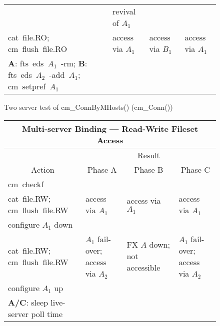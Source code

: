 \begin{figure}
\begin{tabular}{|p{1.4in}|p{0.9in}|p{0.9in}|p{0.9in}|}
 &
{\raggedright revival of $A_{1}$} \\
%
\hline
{\raggedright cat~file.RO;\\cm~flush~file.RO} &
{\raggedright access via $A_{1}$} &
{\raggedright access via $B_{1}$} &
{\raggedright access via $A_{1}$} \\
%
\hline
{\raggedright
  {\bf A}: fts~eds~$A_{1}$~-rm;\\
  {\bf B}: fts~eds~$A_{2}$~-add~$A_{1}$;\\cm~setpref~$A_{1}$} & & & \\
%
\hline
\end{tabular}
\caption{Two server test of cm\_ConnByMHosts() (cm\_Conn())}
\label{fig:connbymhosts2}
\end{figure}



\begin{figure}
\begin{tabular}{|p{1.4in}|p{0.9in}|p{0.9in}|p{0.9in}|}
\hline
\multicolumn{4}{|c|}{Multi-server Binding --- Read-Write Fileset Access} \\
\hline
\hline
 & \multicolumn{3}{c|}{Result} \\ \cline{2-4}
\multicolumn{1}{|c|}{Action} & \multicolumn{1}{c|}{Phase A} &
    \multicolumn{1}{c|}{Phase B} & \multicolumn{1}{c|}{Phase C} \\
%
\hline
{\raggedright cm~checkf} & & & \\
%
\hline
{\raggedright cat~file.RW;\\cm~flush~file.RW} &
{\raggedright access via $A_{1}$} &
{\raggedright access via $A_{1}$} &
{\raggedright access via $A_{1}$} \\
%
\hline
{\raggedright configure $A_{1}$ down} & & & \\
%
\hline
{\raggedright cat~file.RW;\\cm~flush~file.RW} &
{\raggedright $A_{1}$ fail-over;\\access via $A_{2}$} &
{\raggedright FX $A$ down;\\not accessible} &
{\raggedright $A_{1}$ fail-over;\\access via $A_{2}$} \\
%
\hline
{\raggedright configure $A_{1}$ up} & & & \\
%
\hline
{\raggedright
  {\bf A/C}: sleep live-server poll time\\
}
\end{tabular}
\end{figure}
